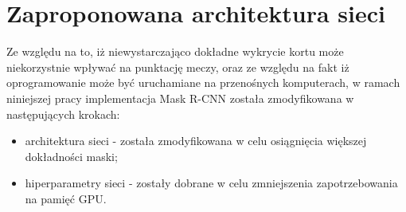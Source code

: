\newpage
\section{Zaproponowana architektura sieci}
\label{sec:zaproponowana_architektura}

Ze względu na to, iż niewystarczająco dokładne wykrycie kortu może niekorzystnie wpływać na punktację meczy, oraz ze względu na fakt iż oprogramowanie może być uruchamiane na przenośnych komputerach, w ramach niniejszej pracy implementacja Mask R-CNN została zmodyfikowana w następujących krokach:

\begin{itemize}
	\item architektura sieci - została zmodyfikowana w celu osiągnięcia większej dokładności maski;
	\item hiperparametry sieci - zostały dobrane w celu zmniejszenia zapotrzebowania na pamięć GPU.
\end{itemize}

